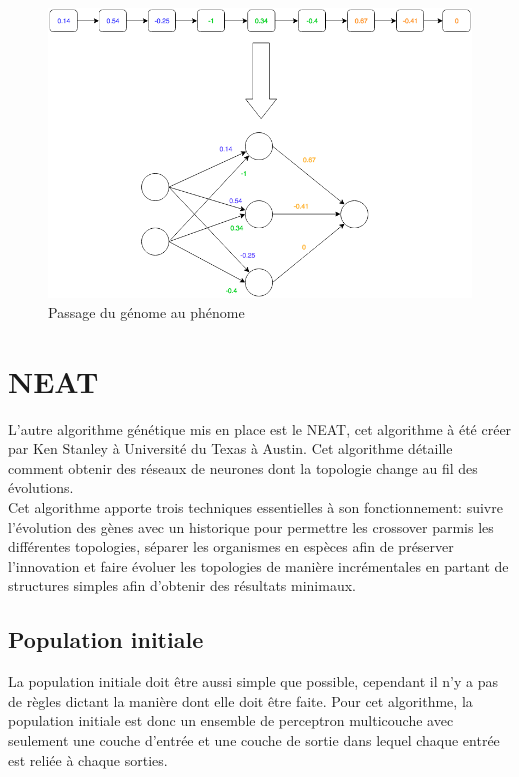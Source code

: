 \documentclass{article}
\begin{document}
\begin{figure}[h]
\begin{center}
	\includegraphics[scale=0.6]{genomephenome.png}
	\caption{Passage du génome au phénome}
\end{center}
\end{figure}

\section{NEAT}

L'autre algorithme génétique mis en place est le NEAT, cet algorithme à été créer par Ken Stanley à Université du Texas à Austin. Cet algorithme détaille comment obtenir des réseaux de neurones dont la topologie change au fil des évolutions.\\
Cet algorithme apporte trois techniques essentielles à son fonctionnement: suivre l'évolution des gènes avec un historique pour permettre les crossover parmis les différentes topologies, séparer les organismes en espèces afin de préserver l'innovation et faire évoluer les topologies de manière incrémentales en partant de structures simples afin d'obtenir des résultats minimaux.\cite{wikineat}

\subsection{Population initiale}

La population initiale doit être aussi simple que possible, cependant il n'y a pas de règles dictant la manière dont elle doit être faite. Pour cet algorithme, la population initiale est donc un ensemble de perceptron multicouche avec seulement une couche d'entrée et une couche de sortie dans lequel chaque entrée est reliée à chaque sorties.
\end{document}
